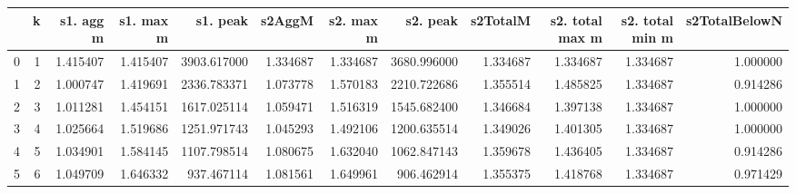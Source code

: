 \begin{tabular}{lrrrrrrrrrrr}
\toprule
{} &  k &  s1. agg m &  s1. max m &     s1. peak &    s2AggM &  s2. max m &     s2. peak &  s2TotalM &  s2. total max m &  s2. total min m &  s2TotalBelowN \\
\midrule
0 &  1 &   1.415407 &   1.415407 &  3903.617000 &  1.334687 &   1.334687 &  3680.996000 &  1.334687 &         1.334687 &         1.334687 &       1.000000 \\
1 &  2 &   1.000747 &   1.419691 &  2336.783371 &  1.073778 &   1.570183 &  2210.722686 &  1.355514 &         1.485825 &         1.334687 &       0.914286 \\
2 &  3 &   1.011281 &   1.454151 &  1617.025114 &  1.059471 &   1.516319 &  1545.682400 &  1.346684 &         1.397138 &         1.334687 &       1.000000 \\
3 &  4 &   1.025664 &   1.519686 &  1251.971743 &  1.045293 &   1.492106 &  1200.635514 &  1.349026 &         1.401305 &         1.334687 &       1.000000 \\
4 &  5 &   1.034901 &   1.584145 &  1107.798514 &  1.080675 &   1.632040 &  1062.847143 &  1.359678 &         1.436405 &         1.334687 &       0.914286 \\
5 &  6 &   1.049709 &   1.646332 &   937.467114 &  1.081561 &   1.649961 &   906.462914 &  1.355375 &         1.418768 &         1.334687 &       0.971429 \\
\bottomrule
\end{tabular}
